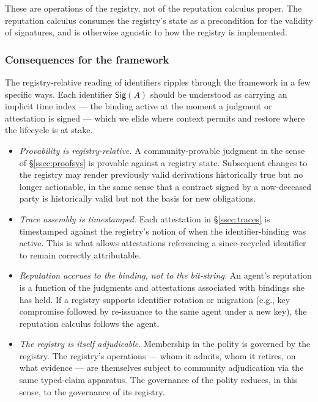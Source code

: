 \documentclass[11pt]{article}
\theoremstyle{definition}
\theoremstyle{plain}
\theoremstyle{remark}
\newcommand{\Sig}{\mathsf{Sig}}
\begin{document}
These are operations of the registry, not of the reputation calculus proper. The reputation calculus consumes the registry's state as a precondition for the validity of signatures, and is otherwise agnostic to how the registry is implemented.

\subsubsection*{Consequences for the framework}

The registry-relative reading of identifiers ripples through the framework in a few specific ways. Each identifier $\Sig(A)$ should be understood as carrying an implicit time index --- the binding active at the moment a judgment or attestation is signed --- which we elide where context permits and restore where the lifecycle is at stake.

\begin{itemize}[leftmargin=*]
\item \emph{Provability is registry-relative.} A community-provable judgment in the sense of \S\ref{ssec:proofsys} is provable against a registry state. Subsequent changes to the registry may render previously valid derivations historically true but no longer actionable, in the same sense that a contract signed by a now-deceased party is historically valid but not the basis for new obligations.
\item \emph{Trace assembly is timestamped.} Each attestation in \S\ref{ssec:traces} is timestamped against the registry's notion of when the identifier-binding was active. This is what allows attestations referencing a since-recycled identifier to remain correctly attributable.
\item \emph{Reputation accrues to the binding, not to the bit-string.} An agent's reputation is a function of the judgments and attestations associated with bindings she has held. If a registry supports identifier rotation or migration (e.g., key compromise followed by re-issuance to the same agent under a new key), the reputation calculus follows the agent.
\item \emph{The registry is itself adjudicable.} Membership in the polity is governed by the registry. The registry's operations --- whom it admits, whom it retires, on what evidence --- are themselves subject to community adjudication via the same typed-claim apparatus. The governance of the polity reduces, in this sense, to the governance of its registry.
\end{itemize}
\end{document}
